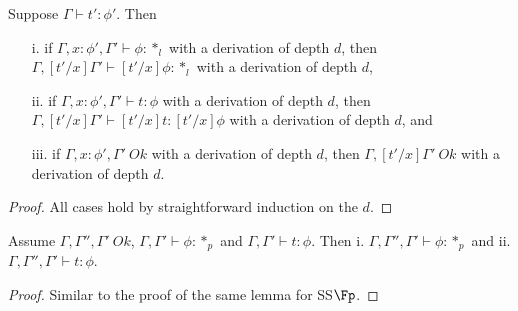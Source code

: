 \begin{lemma}
  \label{lemma:term_substitution_for_kinding_context_ok_ssfe}
  Suppose $\Gamma \vdash t':\phi'$.  Then
  \begin{itemize}
  \item[i.] if $\Gamma,x:\phi',\Gamma' \vdash \phi:*_l$ with a
    derivation of depth $d$, then $\Gamma,[t'/x]\Gamma' \vdash
    [t'/x]\phi:*_l$ with a derivation of depth $d$,
  \item[ii.] if $\Gamma, x:\phi',\Gamma' \vdash t:\phi$ with a 
    derivation of depth $d$, then $\Gamma,[t'/x]\Gamma' \vdash [t'/x]t:[t'/x]\phi$ 
    with a derivation of depth $d$, and
  \item[iii.] if $\Gamma,x:\phi',\Gamma'\ Ok$ with a derivation of depth $d$, then 
    $\Gamma,[t'/x]\Gamma'\ Ok$ with a derivation of depth $d$.
  \end{itemize}
\end{lemma}
\begin{proof}
  All cases hold by straightforward induction on the $d$.
\end{proof}

\begin{lemma}
  \label{lemma:context_weakening_for_kinding_and_typing_ssfe}
  Assume $\Gamma,\Gamma'',\Gamma'\ Ok$, $\Gamma,\Gamma' \vdash \phi:*_p$ and 
  $\Gamma,\Gamma' \vdash t:\phi$.  Then i. $\Gamma,\Gamma'',\Gamma' \vdash \phi:*_p$ and
  ii. $\Gamma,\Gamma'',\Gamma' \vdash t:\phi$. 
\end{lemma}
\begin{proof}
  Similar to the proof of the same lemma for SS$\Fp$.
\end{proof}

